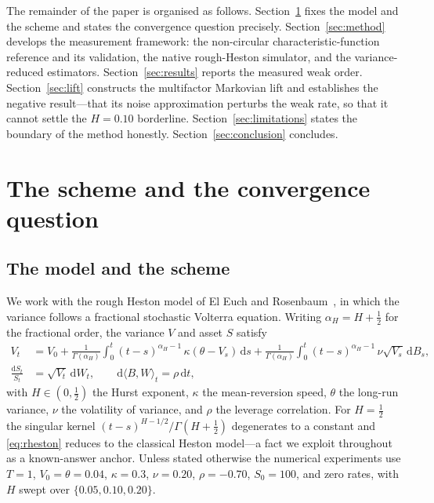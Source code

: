 \documentclass{ws-ijtaf}
\begin{document}
The remainder of the paper is organised as follows.
Section~\ref{sec:scheme} fixes the model and the scheme and states the convergence
question precisely. Section~\ref{sec:method} develops the measurement framework:
the non-circular characteristic-function reference and its validation, the native
rough-Heston simulator, and the variance-reduced estimators.
Section~\ref{sec:results} reports the measured weak order.
Section~\ref{sec:lift} constructs the multifactor Markovian lift and establishes the
negative result---that its noise approximation perturbs the weak rate, so that it
cannot settle the $H=0.10$ borderline.
Section~\ref{sec:limitations} states the boundary of the method honestly.
Section~\ref{sec:conclusion} concludes.

\section{The scheme and the convergence question}\label{sec:scheme}

\subsection{The model and the scheme}

We work with the rough Heston model of El Euch and Rosenbaum~\citeyearpar{eer2019}, in which the variance
follows a fractional stochastic Volterra equation. Writing $\alpha_{\!H}=H+\tfrac12$
for the fractional order, the variance $V$ and asset $S$ satisfy
\begin{align}
V_t &= V_0 + \frac{1}{\Gamma(\alpha_{\!H})}\int_0^t (t-s)^{\alpha_{\!H}-1}\,
       \kappa(\theta - V_s)\,\mathrm{d}s
     + \frac{1}{\Gamma(\alpha_{\!H})}\int_0^t (t-s)^{\alpha_{\!H}-1}\,
       \nu\sqrt{V_s}\,\mathrm{d}B_s, \label{eq:rheston}\\
\frac{\mathrm{d}S_t}{S_t} &= \sqrt{V_t}\,\mathrm{d}W_t,
\qquad \mathrm{d}\langle B,W\rangle_t = \rho\,\mathrm{d}t,
\end{align}
with $H\in(0,\tfrac12)$ the Hurst exponent, $\kappa$ the mean-reversion speed,
$\theta$ the long-run variance, $\nu$ the volatility of variance, and $\rho$ the
leverage correlation. For $H=\tfrac12$ the singular kernel
$(t-s)^{H-1/2}/\Gamma(H+\tfrac12)$ degenerates to a constant and \eqref{eq:rheston}
reduces to the classical Heston model---a fact we exploit throughout as a known-answer
anchor. Unless stated otherwise the numerical experiments use
$T=1$, $V_0=\theta=0.04$, $\kappa=0.3$, $\nu=0.20$, $\rho=-0.70$, $S_0=100$, and zero
rates, with $H$ swept over $\{0.05,0.10,0.20\}$.
\end{document}
